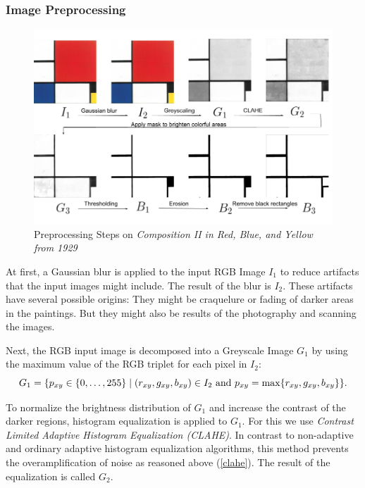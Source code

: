 \documentclass[serif,article,noparskip]{agse-thesis}
\begin{document}
\subsubsection{Image Preprocessing} \label{preprocessing}

\begin{figure}
  \includegraphics[width=\linewidth]{images/preprocessing_steps.png}
  \caption{Preprocessing Steps on \textit{Composition II in Red, Blue, and Yellow
  from 1929}}
  \label{fig:preprocessing}
\end{figure}

At first, a Gaussian blur is applied to the input RGB Image $I_1$ to reduce
artifacts that the input images might include. The result of the blur is $I_2$.
These artifacts have several possible origins: They might be craquelure or
fading of darker areas in the paintings. But they might also be results of the
photography and scanning the images.

Next, the RGB input image is decomposed into a Greyscale Image $G_1$ by using
the maximum value of the RGB triplet for each pixel in $I_2$:
\begin{equation}
G_1 = \{p_{xy} \in \{0,\ldots,255\} \mid (r_{xy},g_{xy},b_{xy})\in I_2\text{ and }p_{xy}=\max\{r_{xy},g_{xy},b_{xy}\}\}.\\
\end{equation}

To normalize the brightness distribution of $G_1$ and increase the contrast of
the darker regions, histogram equalization is applied to $G_1$. For this we
use \textit{Contrast Limited Adaptive Histogram Equalization (CLAHE)}. In
contrast to non-adaptive and ordinary adaptive histogram equalization
algorithms, this method prevents the overamplification of noise as reasoned
above (\ref{clahe}). The result of the equalization is called $G_2$. \cite{Pizer1987}
\end{document}
